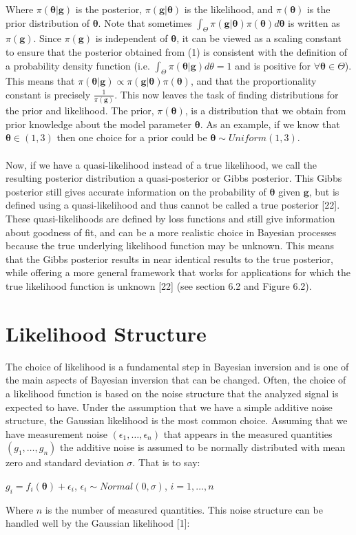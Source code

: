 \documentclass[botnum, fleqn]{unmeethesis}
\begin{document}
	

\noindent Where $\pi(\bm{\theta}|\bm{g})$ is the posterior, $\pi(\bm{g}|\bm{\theta})$ is the likelihood, and $\pi(\bm{\theta})$ is the prior distribution of $\bm{\theta}$. Note that sometimes $\int_{\Theta}\pi(\bm{g}|\bm{\theta})\pi(\bm{\theta})d\bm{\theta}$ is written as $\pi(\bm{g})$. Since $\pi(\bm{g})$ is independent of $\bm{\theta}$, it can be viewed as a scaling constant to ensure that the posterior obtained from (1) is consistent with the definition of a probability density function (i.e. $\int_{\Theta}\pi(\bm{\theta}|\bm{g})d\theta=1$ and is positive for $\forall \bm{\theta} \in \Theta$). This means that $\pi(\bm{\theta}|\bm{g}) \propto \pi(\bm{g}|\bm{\theta})\pi(\bm{\theta})$, and that the proportionality constant is precisely {\large$\frac{1}{\pi(\bm{g})}$}. This now leaves the task of finding distributions for the prior and likelihood. The prior, $\pi(\bm{\theta})$, is a distribution that we obtain from prior knowledge about the model parameter $\bm{\theta}$. As an example, if we know that $\bm{\theta} \in(1,3)$ then one choice for a prior could be $\bm{\theta}\sim Uniform(1,3)$. \\\\Now, if we have a quasi-likelihood instead of a true likelihood, we call the resulting posterior distribution a quasi-posterior or Gibbs posterior. This Gibbs posterior still gives accurate information on the probability of $\bm{\theta}$ given $\bm{g}$, but is defined using a quasi-likelihood and thus cannot be called a true posterior [22]. These quasi-likelihoods are defined by loss functions and still give information about goodness of fit, and can be a more realistic choice in Bayesian processes because the true underlying likelihood function may be unknown. This means that the Gibbs posterior results in near identical results to the true posterior, while offering a more general framework that works for applications for which the true likelihood function is unknown [22] (see section 6.2 and Figure 6.2). 
\section{\label{section:Likelihood Structure}Likelihood Structure}
The choice of likelihood is a fundamental step in Bayesian inversion and is one of the main aspects of Bayesian inversion that can be changed. Often, the choice of a likelihood function is based on the noise structure that the analyzed signal is expected to have. Under the assumption that we have a simple additive noise structure, the Gaussian likelihood is the most common choice. Assuming that we have measurement noise $(\epsilon_1,…,\epsilon_n)$ that appears in the measured quantities $(g_1,…,g_n)$ the additive noise is assumed to be normally distributed with mean zero and standard deviation $\sigma$. That is to say:
\begin{center}
$g_i=f_i(\bm{\theta})+\epsilon_i$,\hspace{1cm} $\epsilon_i\sim Normal(0, \sigma)$,\hspace{1cm} $i=1,…,n$
\end{center}
Where $n$ is the number of measured quantities. This noise structure can be handled well by the Gaussian likelihood [1]:
\end{document}
